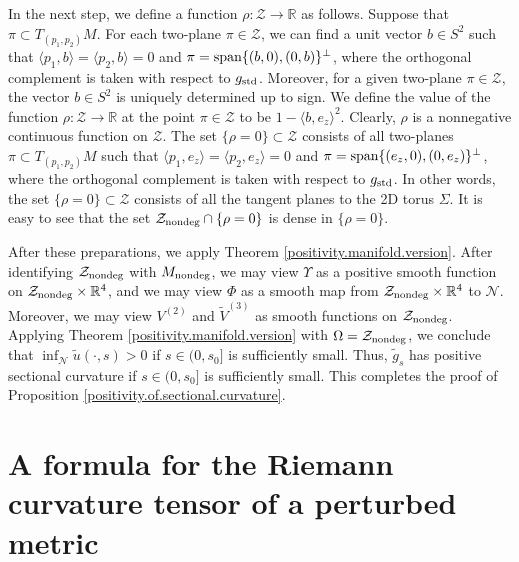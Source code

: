 \documentclass[11pt]{amsart}
\theoremstyle{definition}
\begin{document}
In the next step, we define a function $\rho: \mathcal{Z} \to \mathbb{R}$ as follows. Suppose that $\pi \subset T_{(p_1,p_2)} M$. For each two-plane $\pi \in \mathcal{Z}$, we can find a unit vector $b \in S^2$ such that $\langle p_1,b \rangle = \langle p_2,b \rangle = 0$ and $\pi = \text{\rm span}\{(b,0),(0,b)\}^\perp$, where the orthogonal complement is taken with respect to $g_{\text{\rm std}}$. Moreover, for a given two-plane $\pi \in \mathcal{Z}$, the vector $b \in S^2$ is uniquely determined up to sign. We define the value of the function $\rho: \mathcal{Z} \to \mathbb{R}$ at the point $\pi \in \mathcal{Z}$ to be $1-\langle b,e_z \rangle^2$. Clearly, $\rho$ is a nonnegative continuous function on $\mathcal{Z}$. The set $\{\rho=0\} \subset \mathcal{Z}$ consists of all two-planes $\pi \subset T_{(p_1,p_2)} M$ such that $\langle p_1,e_z \rangle = \langle p_2,e_z \rangle = 0$ and $\pi = \text{\rm span}\{(e_z,0),(0,e_z)\}^\perp$, where the orthogonal complement is taken with respect to $g_{\text{\rm std}}$. In other words, the set $\{\rho=0\} \subset \mathcal{Z}$ consists of all the tangent planes to the 2D torus $\Sigma$. It is easy to see that the set $\mathcal{Z}_{\text{\rm nondeg}} \cap \{\rho=0\}$ is dense in $\{\rho=0\}$.

After these preparations, we apply Theorem \ref{positivity.manifold.version}. After identifying $\mathcal{Z}_{\rm nondeg}$ with $M_{\text{\rm nondeg}}$, we may view $\Upsilon$ as a positive smooth function on $\mathcal{Z}_{\text{\rm nondeg}} \times \mathbb{R}^4$, and we may view $\Phi$ as a smooth map from $\mathcal{Z}_{\text{\rm nondeg}} \times \mathbb{R}^4$ to $\mathcal{N}$. Moreover, we may view $V^{(2)}$ and $\tilde{V}^{(3)}$ as smooth functions on $\mathcal{Z}_{\text{\rm nondeg}}$. Applying Theorem \ref{positivity.manifold.version} with $\Omega = \mathcal{Z}_{\text{\rm nondeg}}$, we conclude that $\inf_{\mathcal{N}} \tilde{u}(\cdot,s) > 0$ if $s \in (0,s_0]$ is sufficiently small. Thus, $\tilde{g}_s$ has positive sectional curvature if $s \in (0,s_0]$ is sufficiently small. This completes the proof of Proposition \ref{positivity.of.sectional.curvature}. \\

\appendix

\section{A formula for the Riemann curvature tensor of a perturbed metric}

\label{curvature.of.perturbed.metric}
\end{document}
